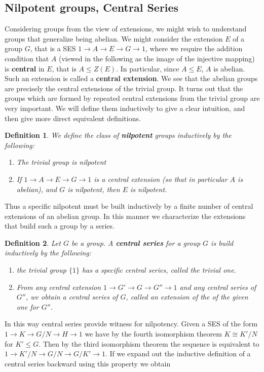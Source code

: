\documentclass{report}
\newtheorem{defi}{Definition}
\begin{document}
\begin{singlespace}
\begin{enumerate}
\section{Nilpotent groups, Central Series}
Considering groups from the view of extensions, we might wish to understand groups that generalize being abelian. We might consider the extension $E$ of a group $G$, that is a SES $1\to A\to E\to G\to 1$, where we require the addition condition that $A$ (viewed in the following as the image of the injective mapping) is \textbf{central} in $E$, that is $A\leq Z(E)$. In particular, since $A\leq E$, $A$ is abelian. Such an extension is called a \textbf{central extension}. We see that the abelian groups are precisely the central extensions of the trivial group. It turns out that the groups which are formed by repeated central extensions from the trivial group are very important. We will define them inductively to give a clear intuition, and then give more direct equivalent definitions.
\begin{defi}
  We define the class of \textbf{nilpotent} groups inductively by the following:
  \begin{enumerate}
  \item The trivial group is nilpotent
  \item If $1\to A\to E\to G\to 1$ is a central extension (so that in particular $A$ is abelian), and $G$ is nilpotent, then $E$ is nilpotent.
  \end{enumerate}
\end{defi}
Thus a specific nilpotent must be built inductively by a finite number of central extensions of an abelian group. In this manner we characterize the extensions that build such a group by a series.
\begin{defi}
  Let $G$ be a group. A \textbf{central series} for a group $G$ is build inductively by the following:
  \begin{enumerate}
  \item the trivial group $\{1\}$ has a specific central series, called the trivial one.
  \item From any central extension $1\to G'\to G\to G''\to 1$ and any central series of $G''$, we obtain a central series of $G$, called an \textit{extension} of the of the given one for $G''$.
  \end{enumerate}
\end{defi}
In this way central series provide witness for nilpotency. Given a SES of the form $1\to K\to G/N \to H\to 1$ we have by the fourth isomorphism theorem $K\cong K'/N$ for $K'\leq G$. Then by the third isomorphism theorem the sequence is equivalent to $1\to K'/N\to G/N\to G/K'\to 1$. If we expand out the inductive definition of a central series backward using this property we obtain

\end{enumerate}
\end{singlespace}
\end{document}
